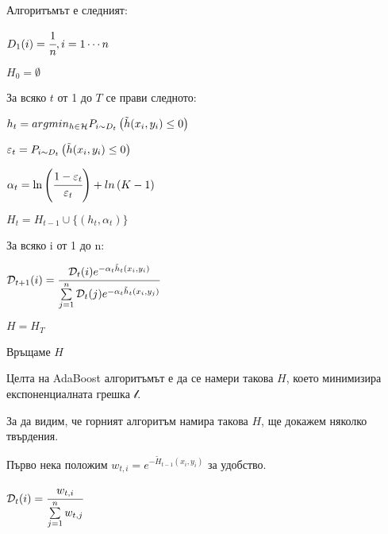 \documentclass[main.tex]{subfiles}
\begin{document}
Алгоритъмът е следният:

\begin{exampleenv}
	\begin{alg}
		\item $D_1(i) = \cfrac{1}{n}, i = 1\cdots n$
		\item $H_0 = \emptyset$
		\item За всяко $t$ от 1 до $T$ се прави следното:
		\begin{alg}
			\item $h_t = argmin_{h\in \mathcal{H}} P_{i\sim D_t}\left(\tilde{h}(x_i, y_i) \leq 0\right)$
			\item $\varepsilon_t = P_{i\sim D_t}\left(\tilde{h}(x_i, y_i) \leq 0\right)$
			\item $\alpha_t = \ln\left(\cfrac{1 - \varepsilon_t}{\varepsilon_t}\right) + ln\left(K-1\right)$
			\item $H_t = H_{t-1} \cup \{(h_t, \alpha_t)\}$
			\item За всяко i от 1 до n:
			\begin{alg}
				\item $\mathcal{D}_{t+1}(i) = \cfrac{\mathcal{D}_t(i) e^{-\alpha_t \tilde{h}_t(x_i, y_i)}}{\sum\limits_{j=1}^n \mathcal{D}_t(j) e^{-\alpha_t \tilde{h}_t(x_i, y_j)}}$
			\end{alg} 
		\end{alg}
		\item $H = H_T$
		\item Връщаме $H$
	\end{alg}
\end{exampleenv}

Целта на AdaBoost алгоритъмът е да се намери такова $H$, което минимизира експоненциалната грешка $\mathcal{l}$.

За да видим, че горният алгоритъм намира такова $H$, ще докажем няколко твърдения. 

Първо нека положим $w_{t,i} = e^{-\tilde{H}_{t-1}(x_i, y_i)}$ за удобство.

\begin{lemma}
	$\mathcal{D}_t(i) = \cfrac{w_{t, i}}{\sum\limits_{j=1}^n w_{t, j}}$ 
\end{lemma}
\end{document}

